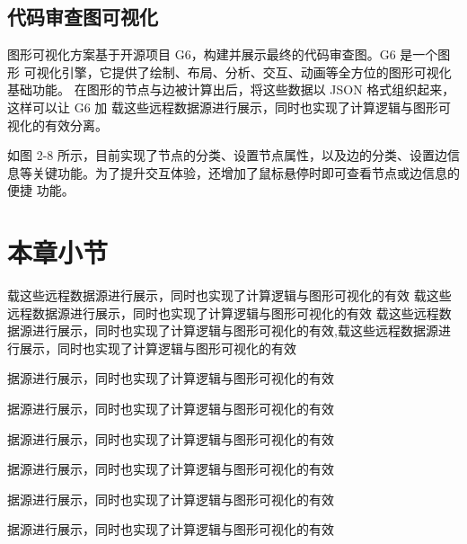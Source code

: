 \subsection{代码审查图可视化}

图形可视化方案基于开源项目 G6，构建并展示最终的代码审查图。G6 是一个图形
可视化引擎，它提供了绘制、布局、分析、交互、动画等全方位的图形可视化基础功能。
在图形的节点与边被计算出后，将这些数据以 JSON 格式组织起来，这样可以让 G6 加
载这些远程数据源进行展示，同时也实现了计算逻辑与图形可视化的有效分离。


如图 2-8 所示，目前实现了节点的分类、设置节点属性，以及边的分类、设置边信
息等关键功能。为了提升交互体验，还增加了鼠标悬停时即可查看节点或边信息的便捷
功能。

\section{本章小节}

载这些远程数据源进行展示，同时也实现了计算逻辑与图形可视化的有效
载这些远程数据源进行展示，同时也实现了计算逻辑与图形可视化的有效
载这些远程数据源进行展示，同时也实现了计算逻辑与图形可视化的有效,载这些远程数据源进行展示，同时也实现了计算逻辑与图形可视化的有效

据源进行展示，同时也实现了计算逻辑与图形可视化的有效

据源进行展示，同时也实现了计算逻辑与图形可视化的有效

据源进行展示，同时也实现了计算逻辑与图形可视化的有效

据源进行展示，同时也实现了计算逻辑与图形可视化的有效

据源进行展示，同时也实现了计算逻辑与图形可视化的有效

据源进行展示，同时也实现了计算逻辑与图形可视化的有效



